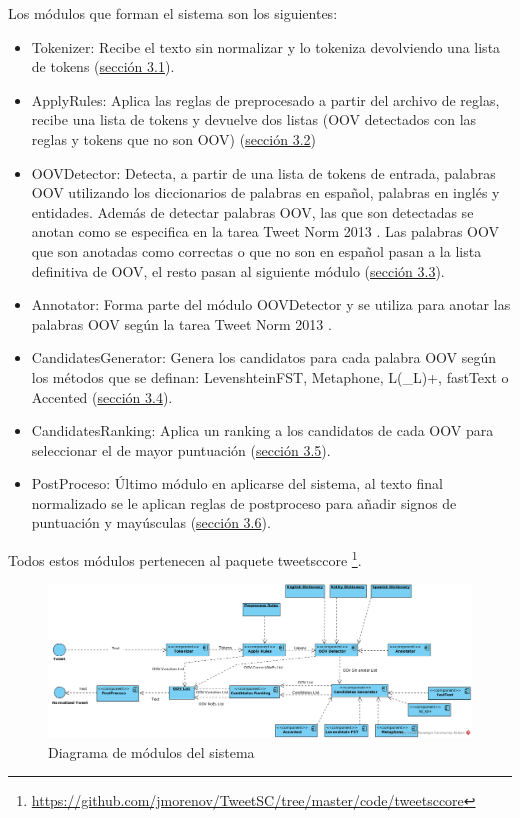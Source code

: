 \documentclass[spanish,12pt, a4paper,twoside]{paper}
\begin{document}
Los módulos que forman el sistema son los siguientes:
\begin{itemize}
	\item Tokenizer: Recibe el texto sin normalizar y lo tokeniza devolviendo una lista de tokens (\hyperref[sec:tokenizacion]{sección 3.1}).
	\item ApplyRules: Aplica las reglas de preprocesado a partir del archivo de reglas, recibe una lista de tokens y devuelve dos listas (OOV detectados con las reglas y tokens que no son OOV) (\hyperref[sec:reglasdepreprocesado]{sección 3.2})
	\item OOVDetector: Detecta, a partir de una lista de tokens de entrada, palabras OOV utilizando los diccionarios de palabras en español, palabras en inglés y entidades. Además de detectar palabras OOV, las que son detectadas se anotan como se especifica en la tarea Tweet Norm 2013 \cite{alegria:2013}. Las palabras OOV que son anotadas como correctas o que no son en español pasan a la lista definitiva de OOV, el resto pasan al siguiente módulo (\hyperref[sec:detecciondeoov]{sección 3.3}).
	\item Annotator: Forma parte del módulo OOVDetector y se utiliza para anotar las palabras OOV según la tarea Tweet Norm 2013 \cite{alegria:2013}.
	\item CandidatesGenerator: Genera los candidatos para cada palabra OOV según los métodos que se definan: LevenshteinFST, Metaphone, L(\_L)+, fastText o Accented (\hyperref[sec:generaciondecandidatosoov]{sección 3.4}).
	\item CandidatesRanking: Aplica un ranking a los candidatos de cada OOV para seleccionar el de mayor puntuación (\hyperref[sec:rankingdecandidatos]{sección 3.5}).
	\item PostProceso: Último módulo en aplicarse del sistema, al texto final normalizado se le aplican reglas de postproceso para añadir signos de puntuación y mayúsculas (\hyperref[sec:postproceso]{sección 3.6}).
\end{itemize}
Todos estos módulos pertenecen al paquete tweetsccore \footnote{\url{https://github.com/jmorenov/TweetSC/tree/master/code/tweetsccore}}.

\begin{figure}[h]
 \includegraphics[width=1.2\textwidth]{recursos/DiagramaDelSistema.png}
\caption{Diagrama de módulos del sistema}
\label{fig:diagramadelsistema}
\end{figure}
\end{document}
